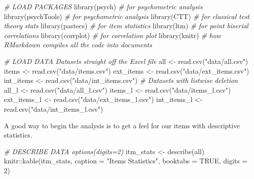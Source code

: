 \documentclass[
]{report}
\newenvironment{Shaded}{\begin{snugshade}}{\end{snugshade}}
\newcommand{\AttributeTok}[1]{\textcolor[rgb]{0.77,0.63,0.00}{#1}}
\newcommand{\CommentTok}[1]{\textcolor[rgb]{0.56,0.35,0.01}{\textit{#1}}}
\newcommand{\ConstantTok}[1]{\textcolor[rgb]{0.00,0.00,0.00}{#1}}
\newcommand{\DecValTok}[1]{\textcolor[rgb]{0.00,0.00,0.81}{#1}}
\newcommand{\FunctionTok}[1]{\textcolor[rgb]{0.00,0.00,0.00}{#1}}
\newcommand{\NormalTok}[1]{#1}
\newcommand{\OtherTok}[1]{\textcolor[rgb]{0.56,0.35,0.01}{#1}}
\newcommand{\SpecialCharTok}[1]{\textcolor[rgb]{0.00,0.00,0.00}{#1}}
\newcommand{\StringTok}[1]{\textcolor[rgb]{0.31,0.60,0.02}{#1}}
\begin{document}
\begin{Shaded}
\begin{Highlighting}[]
\CommentTok{\# LOAD PACKAGES}
\FunctionTok{library}\NormalTok{(psych)  }\CommentTok{\# for psychometric analysis}
\FunctionTok{library}\NormalTok{(psychTools)  }\CommentTok{\# for psychometric analysis}
\FunctionTok{library}\NormalTok{(CTT)  }\CommentTok{\# for classical test theory stats}
\FunctionTok{library}\NormalTok{(pastecs)  }\CommentTok{\# for item statistics}
\FunctionTok{library}\NormalTok{(ltm)  }\CommentTok{\# for point biserial correlations}
\FunctionTok{library}\NormalTok{(corrplot)  }\CommentTok{\# for correlation plot}
\FunctionTok{library}\NormalTok{(knitr)  }\CommentTok{\# how RMarkdown compiles all the code into documents}

\CommentTok{\# LOAD DATA Datasets straight off the Excel file}
\NormalTok{all }\OtherTok{\textless{}{-}} \FunctionTok{read.csv}\NormalTok{(}\StringTok{"data/all.csv"}\NormalTok{)}
\NormalTok{items }\OtherTok{\textless{}{-}} \FunctionTok{read.csv}\NormalTok{(}\StringTok{"data/items.csv"}\NormalTok{)}
\NormalTok{ext\_items }\OtherTok{\textless{}{-}} \FunctionTok{read.csv}\NormalTok{(}\StringTok{"data/ext\_items.csv"}\NormalTok{)}
\NormalTok{int\_items }\OtherTok{\textless{}{-}} \FunctionTok{read.csv}\NormalTok{(}\StringTok{"data/int\_items.csv"}\NormalTok{)}
\CommentTok{\# Datasets with listwise deletion}
\NormalTok{all\_l }\OtherTok{\textless{}{-}} \FunctionTok{read.csv}\NormalTok{(}\StringTok{"data/all\_l.csv"}\NormalTok{)}
\NormalTok{items\_l }\OtherTok{\textless{}{-}} \FunctionTok{read.csv}\NormalTok{(}\StringTok{"data/items\_l.csv"}\NormalTok{)}
\NormalTok{ext\_items\_l }\OtherTok{\textless{}{-}} \FunctionTok{read.csv}\NormalTok{(}\StringTok{"data/ext\_items\_l.csv"}\NormalTok{)}
\NormalTok{int\_items\_l }\OtherTok{\textless{}{-}} \FunctionTok{read.csv}\NormalTok{(}\StringTok{"data/int\_items\_l.csv"}\NormalTok{)}
\end{Highlighting}
\end{Shaded}

A good way to begin the analysis is to get a feel for our items with descriptive statistics.

\begin{Shaded}
\begin{Highlighting}[]
\CommentTok{\# DESCRIBE DATA options(digits=2)}
\NormalTok{itm\_stats }\OtherTok{\textless{}{-}} \FunctionTok{describe}\NormalTok{(all)}
\NormalTok{knitr}\SpecialCharTok{::}\FunctionTok{kable}\NormalTok{(itm\_stats, }\AttributeTok{caption =} \StringTok{"Items Statistics"}\NormalTok{, }\AttributeTok{booktabs =} \ConstantTok{TRUE}\NormalTok{,}
    \AttributeTok{digits =} \DecValTok{2}\NormalTok{)}
\end{Highlighting}
\end{Shaded}
\end{document}
